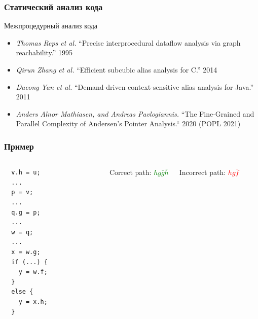 \documentclass{beamer}
\begin{document}
\begin{frame}[fragile]

  \frametitle{Статический анализ кода}

Межпроцедурный анализ кода
\begin{itemize}
\item \emph{Thomas Reps et al.} ``Precise interprocedural dataflow analysis via graph reachability.'' 1995
\pause
\item \emph{Qirun Zhang et al.}  ``Efficient subcubic alias analysis for C.'' 2014
\item \emph{Dacong Yan et al.} ``Demand-driven context-sensitive alias analysis for Java.'' 2011
\pause
\item \emph{Anders Alnor Mathiasen, and Andreas Pavlogiannis.} ``The Fine-Grained and Parallel Complexity of Andersen’s Pointer Analysis.`` 2020 (POPL 2021)
\end{itemize}

\end{frame}

\begin{frame}[fragile]

  \frametitle{Пример}
  \begin{columns}[c] %

 \begin{verbatim}
  v.h = u;
  ...
  p = v;
  ...
  q.g = p;
  ...
  w = q;
  ...
  x = w.g;
  if (...) {
    y = w.f;
  }
  else {
    y = x.h;
  }
\end{verbatim}

\begin{figure}[h]
    \centering
\end{figure}
Correct path: \textcolor{green}{$hg\bar{g}\bar{h}$}

Incorrect path: \textcolor{red}{$hg\bar{f}$}

\end{columns}

\end{frame}
\end{document}
